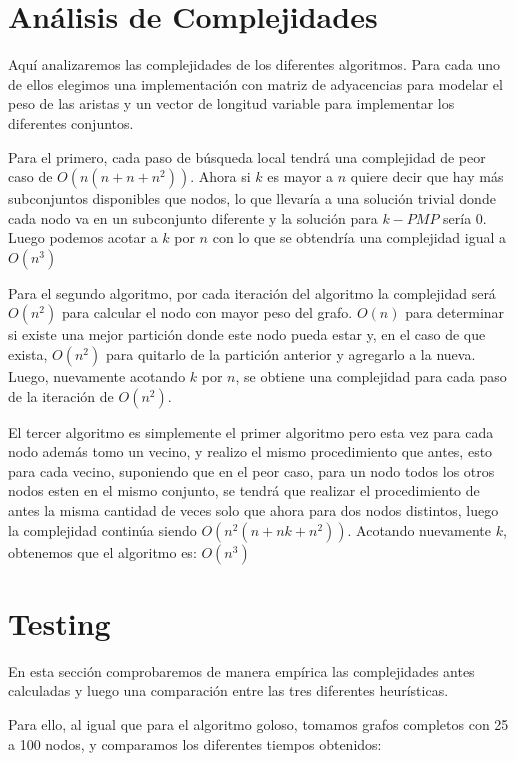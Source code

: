 \newpage

\section{Análisis de Complejidades}

Aquí analizaremos las complejidades de los diferentes algoritmos. Para cada uno de ellos elegimos una implementación con matriz de adyacencias para modelar el peso de las aristas y un vector de longitud variable para implementar los diferentes conjuntos.

Para el primero, cada paso de búsqueda local tendrá una complejidad de peor caso de $O(n(n + n + n^2))$. Ahora si $k$ es mayor a $n$ quiere decir que hay más subconjuntos disponibles que nodos, lo que llevaría a una solución trivial donde cada nodo va en un subconjunto diferente y la solución para $k-PMP$ sería 0.
Luego podemos acotar a $k$ por $n$ con lo que se obtendría una complejidad igual a $O(n^3)$

Para el segundo algoritmo, por cada iteración del algoritmo la complejidad será $O(n^2)$ para calcular el nodo con mayor peso del grafo. $O(n)$ para determinar si existe una mejor partición donde este nodo pueda estar y, en el caso de que exista, $O(n^2)$ para quitarlo de la partición anterior y agregarlo a la nueva. Luego, nuevamente acotando $k$ por $n$, se obtiene una complejidad para cada paso de la iteración de $O(n^2)$.

El tercer algoritmo es simplemente el primer algoritmo pero esta vez para cada nodo además tomo un vecino, y realizo el mismo procedimiento que antes, esto para cada vecino, suponiendo que en el peor caso, para un nodo todos los otros nodos esten en el mismo conjunto, se tendrá que realizar el procedimiento de antes la misma cantidad de veces solo que ahora para dos nodos distintos, luego la complejidad continúa siendo $O(n^2 (n + n k + n^2))$. Acotando nuevamente $k$, obtenemos que el algoritmo es: $O(n^3)$

\section{Testing}

En esta sección comprobaremos de manera empírica las complejidades antes calculadas y luego una comparación entre las tres diferentes heurísticas.

Para ello, al igual que para el algoritmo goloso, tomamos grafos completos con 25 a 100 nodos, y comparamos los diferentes tiempos obtenidos:


